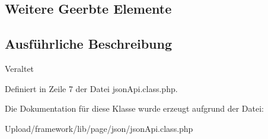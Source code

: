 \subsection*{Weitere Geerbte Elemente}


\subsection{Ausführliche Beschreibung}
\begin{DoxyRefDesc}{Veraltet}
\item[\mbox{\hyperlink{deprecated__deprecated000040}{Veraltet}}]\end{DoxyRefDesc}


Definiert in Zeile 7 der Datei json\+Api.\+class.\+php.



Die Dokumentation für diese Klasse wurde erzeugt aufgrund der Datei\+:\begin{DoxyCompactItemize}
\item 
Upload/framework/lib/page/json/json\+Api.\+class.\+php\end{DoxyCompactItemize}

